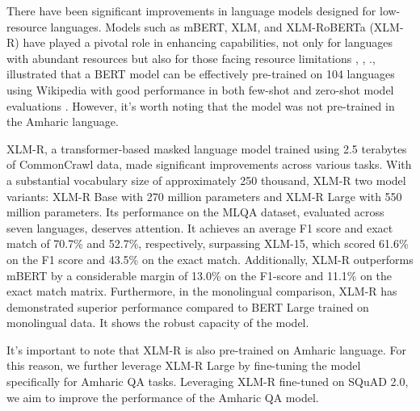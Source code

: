 There have been significant improvements in language models designed for low-resource languages. Models such as mBERT, XLM, and XLM-RoBERTa (XLM-R) have played a pivotal role in enhancing capabilities, not only for languages with abundant resources but also for those facing resource limitations  \cite{devlin-etal-2019-bert}, \cite{liu2019roberta}, \cite{pires-etal-2019-multilingual}.\cite{pires-etal-2019-multilingual}, illustrated that a BERT model can be effectively pre-trained on 104 languages using Wikipedia with good performance in both few-shot and zero-shot model evaluations \cite{liu2019roberta}. However, it's worth noting that the model was not pre-trained in the Amharic language.   

XLM-R, a transformer-based masked language model trained using 2.5 terabytes of CommonCrawl data, made significant improvements across various tasks\cite{conneau2019unsupervised}. With a substantial vocabulary size of approximately 250 thousand, XLM-R two model variants: XLM-R Base with 270 million parameters and XLM-R Large with 550 million parameters. Its performance on the MLQA dataset, evaluated across seven languages, deserves attention. It achieves an average F1 score and exact match of 70.7\% and 52.7\%, respectively, surpassing XLM-15, which scored 61.6\% on the F1 score and 43.5\% on the exact match. Additionally, XLM-R outperforms mBERT by a considerable margin of 13.0\% on the F1-score and 11.1\% on the exact match matrix. Furthermore, in the monolingual comparison, XLM-R has demonstrated superior performance compared to BERT Large trained on monolingual data. It shows the robust capacity of the model.  

It's important to note that XLM-R is also pre-trained on Amharic language. For this reason, we further leverage XLM-R Large by fine-tuning the model specifically for Amharic QA tasks. Leveraging XLM-R fine-tuned on SQuAD 2.0, we aim to improve the performance of the Amharic QA model.
